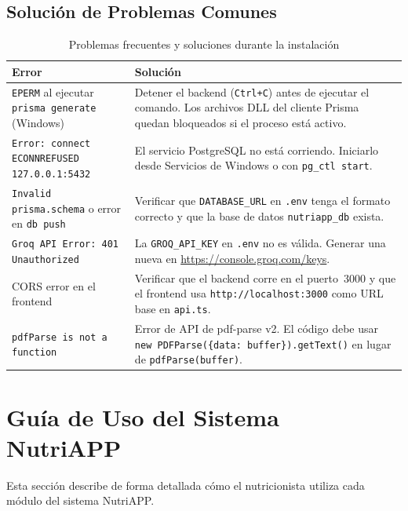 \documentclass[12pt,a4paper]{article}
\begin{document}
\subsection{Solución de Problemas Comunes}

\begin{table}[H]
\centering
\caption{Problemas frecuentes y soluciones durante la instalación}
\label{tab:troubleshoot}
\begin{tabularx}{\linewidth}{|X|X|}
\hline
\textbf{Error} & \textbf{Solución} \\
\hline
\texttt{EPERM} al ejecutar \texttt{prisma generate} (Windows) & Detener el backend (\texttt{Ctrl+C}) antes de ejecutar el comando. Los archivos DLL del cliente Prisma quedan bloqueados si el proceso está activo. \\
\hline
\texttt{Error: connect ECONNREFUSED 127.0.0.1:5432} & El servicio PostgreSQL no está corriendo. Iniciarlo desde Servicios de Windows o con \texttt{pg\_ctl start}. \\
\hline
\texttt{Invalid prisma.schema} o error en \texttt{db push} & Verificar que \texttt{DATABASE\_URL} en \texttt{.env} tenga el formato correcto y que la base de datos \texttt{nutriapp\_db} exista. \\
\hline
\texttt{Groq API Error: 401 Unauthorized} & La \texttt{GROQ\_API\_KEY} en \texttt{.env} no es válida. Generar una nueva en \url{https://console.groq.com/keys}. \\
\hline
CORS error en el frontend & Verificar que el backend corre en el puerto~3000 y que el frontend usa \texttt{http://localhost:3000} como URL base en \texttt{api.ts}. \\
\hline
\texttt{pdfParse is not a function} & Error de API de pdf-parse v2. El código debe usar \texttt{new PDFParse(\{data: buffer\}).getText()} en lugar de \texttt{pdfParse(buffer)}. \\
\hline
\end{tabularx}
\end{table}

\clearpage
\section{Guía de Uso del Sistema NutriAPP}

Esta sección describe de forma detallada cómo el nutricionista utiliza cada módulo
del sistema NutriAPP.
\end{document}
